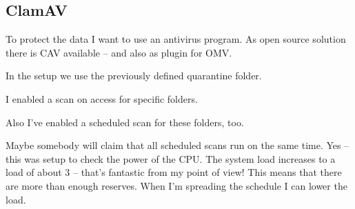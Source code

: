

\subsection{ClamAV}\label{subsec:ClamAV}

To protect the data I want to use an antivirus program. As open source solution
there is \gls{CAV} available -- and also as plugin for \gls{OMV}.


In the setup we use the previously defined quarantine folder.


I enabled a scan on access for specific folders.


Also I've enabled a scheduled scan for these folders, too.


Maybe somebody will claim that all scheduled scans run on the same time.\linebreak
Yes -- this was setup to check the power of the CPU. The system load increases
to a load of about 3 -- that's fantastic from my point of view! This means that
there are more than enough reserves. When I'm spreading the schedule I can
lower the load.

